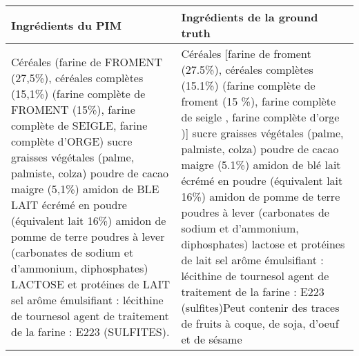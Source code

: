 \begin{tabular}{p{7cm}p{7cm}}
\toprule
                                                                                                                                                                                                                                                                                                                                                                                                                                                                                                                                                                                                                                                                                                                                                                                              Ingrédients du PIM &                                                                                                                                                                                                                                                                                                                                                                                                                                                                                                                                                                                                                                                                                                                                                                             Ingrédients de la ground truth \\
\midrule
                                                                                                                                                                                                                                                                         Céréales (farine de FROMENT (27,5\%), céréales complètes (15,1\%) (farine complète de FROMENT (15\%), farine complète de SEIGLE, farine complète d'ORGE)  sucre  graisses végétales (palme, palmiste, colza)  poudre de cacao maigre (5,1\%)  amidon de BLE  LAIT écrémé en poudre (équivalent lait 16\%)  amidon de pomme de terre  poudres à lever (carbonates de sodium et d'ammonium, diphosphates)  LACTOSE et protéines de LAIT  sel  arôme  émulsifiant : lécithine de tournesol  agent de traitement de la farine : E223 (SULFITES). &                                                                                                                                                                                                   Céréales [farine de froment (27.5\%), céréales complètes (15.1\%) (farine complète de froment (15 \%), farine complète de seigle , farine complète d'orge )] sucre graisses végétales (palme, palmiste, colza) poudre de cacao maigre (5.1\%) amidon de blé lait écrémé en poudre (équivalent lait 16\%) amidon de pomme de terre poudres à lever (carbonates de sodium et d'ammonium, diphosphates) lactose et protéines de lait sel arôme émulsifiant : lécithine de tournesol agent de traitement de la farine : E223 (sulfites)\newline Peut contenir des traces de fruits à coque, de soja, d'oeuf et de sésame \\

\end{tabular}
